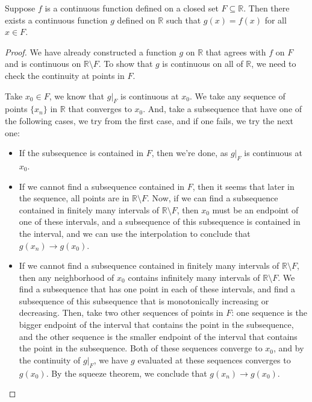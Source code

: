 \documentclass[../main.tex]{subfiles}
\begin{document}
\begin{proposition}{}{}
	Suppose $f$ is a continuous function defined on a closed set $F \subseteq \mathbb{R}$. Then there exists a continuous function $g$ defined on $\mathbb{R}$ such that $g(x) = f(x)$ for all $x \in F$.
\end{proposition}
\begin{proof}
	We have already constructed a function $g$ on $\mathbb{R}$ that agrees with $f$ on $F$ and is continuous on $\mathbb{R} \setminus F$. To show that $g$ is continuous on all of $\mathbb{R}$, we need to check the continuity at points in $F$.

	Take $x_0 \in F$, we know that $g|_F$ is continuous at $x_0$. We take any sequence of points $\{x_n\}$ in $\mathbb{R}$ that converges to $x_0$. And, take a subsequence that have one of the following cases, we try from the first case, and if one fails, we try the next one:
	\begin{itemize}
		\item If the subsequence is contained in $F$, then we're done, as $g|_F$ is continuous at $x_0$.
		\item If we cannot find a subsequence contained in $F$, then it seems that later in the sequence, all points are in $\mathbb{R} \setminus F$. Now, if we can find a subsequence contained in finitely many intervals of $\mathbb{R} \setminus F$, then $x_0$ must be an endpoint of one of these intervals, and a subsequence of this subsequence is contained in the interval, and we can use the interpolation to conclude that $g(x_n) \to g(x_0)$.
		\item If we cannot find a subsequence contained in finitely many intervals of $\mathbb{R} \setminus F$, then any neighborhood of $x_0$ contains infinitely many intervals of $\mathbb{R} \setminus F$. We find a subsequence that has one point in each of these intervals, and find a subsequence of this subsequence that is monotonically increasing or decreasing. Then, take two other sequences of points in $F$: one sequence is the bigger endpoint of the interval that contains the point in the subsequence, and the other sequence is the smaller endpoint of the interval that contains the point in the subsequence. Both of these sequences converge to $x_0$, and by the continuity of $g|_F$, we have $g$ evaluated at these sequences converges to $g(x_0)$. By the squeeze theorem, we conclude that $g(x_n) \to g(x_0)$.
	\end{itemize}
\end{proof}
\end{document}
